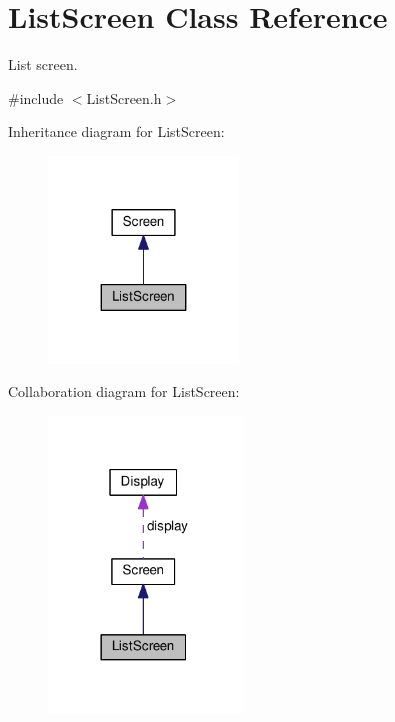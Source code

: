 \hypertarget{classListScreen}{}\section{List\+Screen Class Reference}
\label{classListScreen}


List screen.  




{\ttfamily \#include $<$List\+Screen.\+h$>$}



Inheritance diagram for List\+Screen\+:\nopagebreak
\begin{figure}[H]
\begin{center}
\leavevmode
\includegraphics[width=143pt]{classListScreen__inherit__graph}
\end{center}
\end{figure}


Collaboration diagram for List\+Screen\+:\nopagebreak
\begin{figure}[H]
\begin{center}
\leavevmode
\includegraphics[width=146pt]{classListScreen__coll__graph}
\end{center}
\end{figure}
